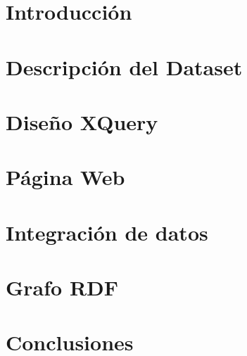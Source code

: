 \documentclass[12pt, a4paper, openany]{article}
\begin{document}


\clearpage
\setcounter{page}{1}



\newpage



\tableofcontents

\section{Introducción}


\section{Descripción del Dataset}


\section{Diseño XQuery}


\section{Página Web}


\section{Integración de datos}


\section{Grafo RDF}



\section{Conclusiones}


\printbibliography

\newpage



\end{document}

